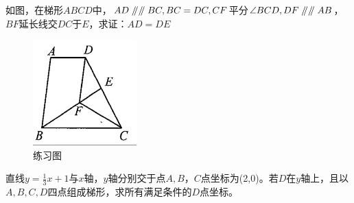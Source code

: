 \documentclass{ecnuthesis}
\newcommand\px{\mathrel{/\mkern-5mu/}}  %
\begin{document}
\begin{problem}
    如图，在梯形$ABCD$中，$AD\px\px BC,BC=DC,CF$平分$\angle BCD,DF\px\px AB$，$BF$延长线交$DC$于$E$，求证：$AD=DE$\\
\end{problem}
\begin{figure}[H]
\centering
\includegraphics[width=4cm]{picture/642.png}
\caption{练习图}
\end{figure}
\begin{problem}
    直线$y=\frac{1}{3}x+1$与$x$轴，$y$轴分别交于点$A,B$，$C$点坐标为(2,0)。若$D$在$y$轴上，且以$A,B,C,D$四点组成梯形，求所有满足条件的$D$点坐标。
\end{problem}
\clearpage
\end{document}
